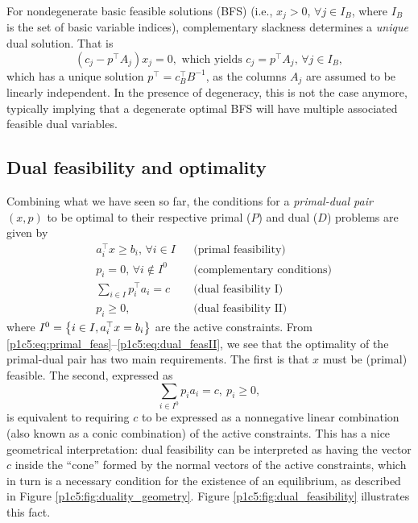 For nondegenerate basic feasible solutions (BFS) (i.e., $x_j > 0$, $\forall j \in I_B$, where $I_B$ is the set of basic variable indices), complementary slackness determines a \emph{unique} dual solution. That is
%
\begin{equation*}
	(c_j - p^\top A_j)x_j = 0, \text{ which yields } c_j = p^\top A_j, \, \forall j \in I_B,
\end{equation*}
%
which has a unique solution $p^\top = c_B^\top B^{-1}$, as the columns $A_j$ are assumed to be linearly independent. In the presence of degeneracy, this is not the case anymore, typically implying that a degenerate optimal BFS will have multiple associated feasible dual variables.


\subsection{Dual feasibility and optimality}

Combining what we have seen so far, the conditions for a \emph{primal-dual pair} $(x,p)$ to be optimal to their respective primal ($P$) and dual ($D$) problems are given by 
%
\begin{align}
	& a_i^\top x \geq b_i, \, \forall i \in I & & \text{(primal feasibility)}\label{p1c5:eq:primal_feas} \\
	& p_i = 0, \, \forall i \notin I^0   & & \text{(complementary conditions)} \label{p1c5:eq:cc}\\
	& \sum_{i \in I} p_i^\top a_i = c & & \text{(dual feasibility I)} \label{p1c5:eq:dual_feasI} \\
	& p_i \geq 0, & & \text{(dual feasibility II)} \label{p1c5:eq:dual_feasII}
\end{align}
%
where $I^0 = \left\{ i \in I, a_i^\top x = b _i \right \}$ are the active constraints. From \eqref{p1c5:eq:primal_feas}--\eqref{p1c5:eq:dual_feasII}, we see that the optimality of the primal-dual pair has two main requirements. The first is that $x$ must be (primal) feasible. The second, expressed as 
%
\begin{equation*}
	\sum_{i \in I^0} p_ia_i = c, \ p_i \geq 0,
\end{equation*}
%
is equivalent to requiring $c$ to be expressed as a nonnegative linear combination (also known as a conic combination) of the active constraints. This has a nice geometrical interpretation: dual feasibility can be interpreted as having the vector $c$ inside the ``cone'' formed by the normal vectors of the active constraints, which in turn is a necessary condition for the existence of an equilibrium, as described in Figure \ref{p1c5:fig:duality_geometry}. Figure \ref{p1c5:fig:dual_feasibility} illustrates this fact.

